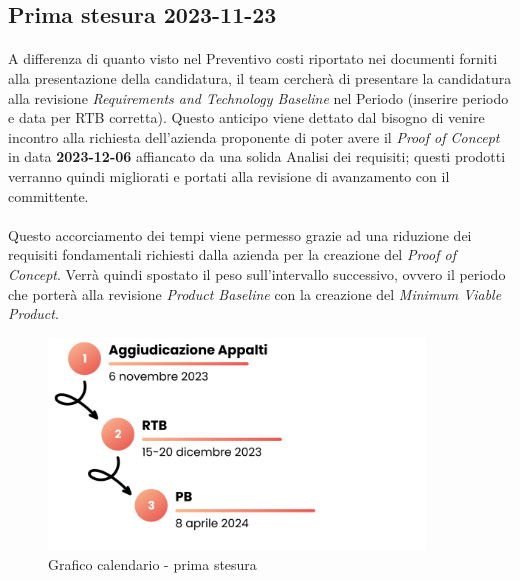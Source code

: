 \documentclass[10pt, a4paper]{article}
\begin{document}
\subsection{Prima stesura 2023-11-23}
\paragraph{}A differenza di quanto visto nel Preventivo costi riportato nei documenti forniti alla presentazione della candidatura, il team cercherà di presentare la candidatura alla revisione \textit{Requirements and Technology Baseline} nel Periodo \color{red}(inserire periodo e data per RTB corretta). \color{black}Questo anticipo viene dettato dal bisogno di venire incontro alla richiesta dell'azienda proponente di poter avere il \textit{Proof of Concept} in data \textbf{2023-12-06} affiancato da una solida Analisi dei requisiti; questi prodotti verranno quindi migliorati e portati alla revisione di avanzamento con il committente.
\paragraph{} Questo accorciamento dei tempi viene permesso grazie ad una riduzione dei requisiti fondamentali richiesti dalla azienda per la creazione del \textit{Proof of Concept}. Verrà quindi spostato il peso sull'intervallo successivo, ovvero il periodo che porterà alla revisione \textit{Product Baseline} con la creazione del \textit{Minimum Viable Product}.

 \begin{figure}[!h]
        \centering
        \includegraphics[width=10cm]{Calendario di massima - prima stesura.png}
        \caption{Grafico calendario - prima stesura}
    \end{figure}

\end{document}
